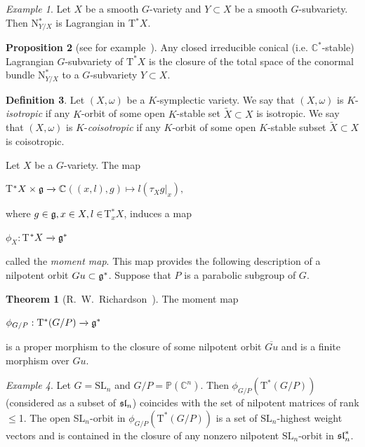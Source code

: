 \documentclass[12pt]{amsart}
\theoremstyle{definition}\newtheorem{theorem}{Theorem}[section]
\newtheorem{proposition}{Proposition}[section]
\theoremstyle{definition}\newtheorem{definition}[proposition]{Definition}
\theoremstyle{remark}\newtheorem{example}[proposition]{Example}
\renewcommand{\to}[1][]{\xrightarrow{#1}}
\begin{document}
\begin{example}\upshape \label{TZX} Let $X$ be a smooth $G$-variety and $Y\subset X$ be a smooth $G$-subvariety. Then N$^*_{Y/X}$ is Lagrangian in T$^*X$.\end{example}
\begin{proposition}[{see for example~\cite[Lemma 1.3.27]{NG}}]\label{NG} Any closed irreducible conical (i.e. $\mathbb C^*$-stable) Lagrangian $G$-subvariety of $\mathrm T^*X$ is the closure of the total space of the conormal bundle $\mathrm N^*_{Y/X}$ to a $G$-subvariety $Y\subset X$.\end{proposition}
\begin{definition}Let $(X, \omega)$ be a $K$-symplectic variety. We say that $(X, \omega)$ is $K$-{\it isotropic} if any $K$-orbit of some open $K$-stable set $\tilde X\subset X$ is isotropic. We say that $(X, \omega)$ is $K$-{\it coisotropic} if any $K$-orbit of some open $K$-stable subset $\tilde X\subset X$ is coisotropic.\end{definition}
Let $X$ be a $G$-variety. The map\begin{center} T$^*X\times\frak g\to\mathbb C$\hspace{40pt}$((x, l), g)\mapsto l(\tau_X g|_x),$\end{center} where $g\in \frak g, x\in X, l\in$T$^*_xX$, induces a map \begin{center}$\phi_X: $T$^*X\to\frak g^*$\end{center} called the {\it{}moment map}. This map provides the following description of a nilpotent orbit $ Gu\subset\frak g^*$. Suppose that $P$ is a parabolic subgroup of $G$.
\begin{theorem}[R.~W.~Richardson~\cite{Rich}]\label{MMapSl}  The moment map \begin{center}$\phi_{G/P}:\mathrm T^*(G/P)\to\frak g^*$\end{center} is a proper morphism to the closure of some nilpotent orbit $\overline{Gu}$ and is a finite morphism over $Gu$.\end{theorem}
\begin{example}\upshape\label{Pn}Let $G=\mathrm{SL}_n$ and $G/P=\mathbb P(\mathbb C^n)$. Then $\phi_{G/P}(\mathrm T^*(G/P))$ (considered as a subset of $\frak{sl}_n$) coincides with the set of nilpotent matrices of rank $\le$1. The open SL$_n$-orbit in $\phi_{G/P}(\mathrm T^*(G/P))$ is a set of $\mathrm{SL}_n$-highest weight vectors and is contained in the closure of any nonzero nilpotent $\mathrm{SL}_n$-orbit in $\frak{sl}_n^*$.\end{example}
\end{document}
